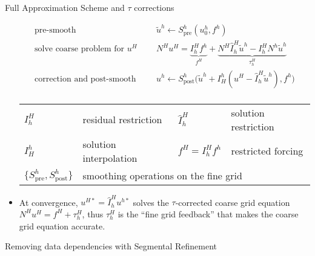 \documentclass[final,t]{beamer}
\begin{document}
\begin{frame}{}
\begin{columns}
\begin{column}{0.31\textwidth}
\begin{block}{Full Approximation Scheme and $\tau$ corrections}
\begin{itemize}
          \begin{equation*}
            \begin{split}
              \text{pre-smooth} \:\: & \quad \tilde u^h \gets S^h_{\text{pre}}(u^h_0, f^h) \\
              \text{solve coarse problem for $u^H$} \:\: & \quad N^H u^H = \underbrace{I_h^H f^h}_{f^H} + \underbrace{N^H \hat I_h^H \tilde u^h - I_h^H N^h \tilde u^h}_{\tau_h^H} \\
              \text{correction and post-smooth} \:\: & \quad u^h \gets S^h_{\text{post}} \Big( \tilde u^h + I_H^h (u^H - \hat I_h^H \tilde u^h), f^h \Big) \\
            \end{split}
          \end{equation*}
          \begin{tabular}{llll}
            \toprule
            $I_h^H$ & residual restriction & $\hat I_h^H$ & solution restriction \\
            $I_H^h$ & solution interpolation & $f^H = I_h^H f^h$ & restricted forcing \\
            $\{S^h_{\text{pre}},S^h_{\text{post}}\}$ & \multicolumn{3}{l}{smoothing operations on the fine grid} \\
            \bottomrule
          \end{tabular}
        \item At convergence, $u^{H*} = \hat I_h^H u^{h*}$ solves the $\tau$-corrected coarse grid equation
            $N^H u^H = f^H + \tau_h^H$,
          thus $\tau_h^H$ is the ``fine grid feedback'' that makes the coarse grid equation accurate.
        \end{itemize}
      \end{block}
      \vspace{-2em}
      \begin{block}{Removing data dependencies with Segmental Refinement}
        \begin{columns}
          \begin{column}{0.7\textwidth}

\end{column}
\end{columns}
\end{block}
\end{column}
\end{columns}
\end{frame}
\end{document}
